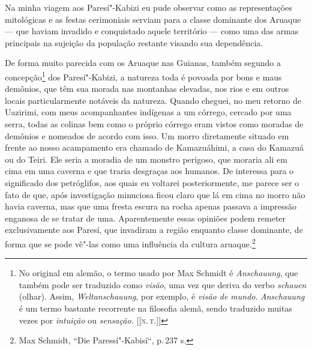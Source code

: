 Na minha viagem aos Paresí"-Kabizi eu pude observar como as
representações mitológicas e as festas cerimoniais serviam para a
classe dominante dos Aruaque --- que haviam invadido e conquistado
aquele território --- como uma das armas principais na sujeição da
população restante visando sua dependência.

De forma muito parecida com os Aruaque nas Guianas, também segundo a
concepção\footnote{No original em alemão, o termo usado por Max
  Schmidt é \textit{Anschauung}, que também pode ser traduzido como
  \textit{visão}, uma vez que deriva do verbo \textit{schauen} (olhar).
  Assim, \textit{Weltanschauung}, por exemplo, é \textit{visão de mundo}.
  \textit{Anschauung} é um termo bastante recorrente na filosofia alemã,
  sendo traduzido muitas vezes por \textit{intuição} ou \textit{sensação.}
  {[}{[}\textsc{n.\,t.}{]}{]}} dos Paresí"-Kabizi, a natureza toda é povoada por bons e maus
demônios, que têm sua morada nas montanhas elevadas, nos rios e em
outros locais particularmente notáveis da natureza. Quando cheguei, no
meu retorno de Uazirimi, com meus acompanhantes indígenas a um córrego,
cercado por uma serra, todas as colinas bem como o próprio córrego eram
vistos como moradas de demônios e nomeados de acordo com isso. Um morro
diretamente situado em frente ao nosso acampamento era chamado de
Kamazuáhimi, a casa do Kamazuá ou do Teiri. Ele seria a moradia de um
monstro perigoso, que moraria ali em cima em uma caverna e que traria
desgraças aos humanos. De interessa para o significado dos petróglifos,
aos quais eu voltarei posteriormente, me parece ser o fato de que, após
investigação minuciosa ficou claro que lá em cima no morro não havia
caverna, mas que uma fresta escura na rocha apenas passava a impressão
enganosa de se tratar de uma. Aparentemente essas opiniões podem
remeter exclusivamente aos Paresí, que invadiram a região enquanto
classe dominante, de forma que se pode vê"-las como uma influência da
cultura aruaque.\footnote{Max Schmidt, ``Die Paressí"-Kabisí``, p.\,237 s.}


